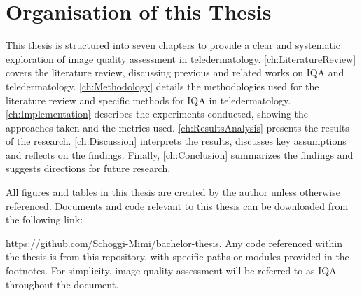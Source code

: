 \section{Organisation of this Thesis}
\label{sec:Structure}
This thesis is structured into seven chapters to provide a clear and systematic exploration of image quality assessment in teledermatology.  \autoref{ch:LiteratureReview} covers the literature review, discussing previous and related works on IQA and teledermatology. \autoref{ch:Methodology} details the methodologies used for the literature review and specific methods for IQA in teledermatology. \autoref{ch:Implementation} describes the experiments conducted, showing the approaches taken and the metrics used. \autoref{ch:ResultsAnalysis} presents the results of the research. \autoref{ch:Discussion} interprets the results, discusses key assumptions and reflects on the findings. Finally, \autoref{ch:Conclusion} summarizes the findings and suggests directions for future research. \par
\vspace{\baselineskip}
\noindent
All figures and tables in this thesis are created by the author unless otherwise referenced. Documents and code relevant to this thesis can be downloaded from the following link: \par \noindent \url{https://github.com/Schoggi-Mimi/bachelor-thesis}. Any code referenced within the thesis is from this repository, with specific paths or modules provided in the footnotes. For simplicity, image quality assessment will be referred to as IQA throughout the document.\par